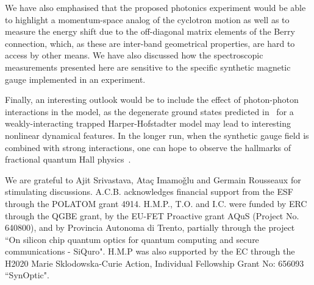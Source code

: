 \documentclass[twocolumn, 10pt, aps, superscriptaddress, floatfix, showpacs, pra, citeautoscript]{revtex4-1}
\begin{document}
We have also emphasised that the proposed photonics experiment would be able to highlight a momentum-space analog of the cyclotron motion as well as to measure the energy shift due to the off-diagonal matrix elements of the Berry connection, which, as these are inter-band geometrical properties, are hard to access by other means. We have also discussed how the spectroscopic measurements presented here are sensitive to the specific synthetic magnetic gauge implemented in an experiment. 

Finally, an interesting outlook would be to include the effect of photon-photon interactions in the model, as the degenerate ground states predicted in~\cite{ozawa2014momhh} for a weakly-interacting trapped Harper-Hofstadter model may lead to interesting nonlinear dynamical features. In the longer run, when the synthetic gauge field is combined with strong interactions, one can hope to observe the hallmarks of fractional quantum Hall physics~\cite{umucalilar2012fractional,hafezi2013non}.


\acknowledgments

We are grateful to Ajit Srivastava, Ata\c{c} Imamo\v{g}lu and Germain Rousseaux for stimulating discussions. A.C.B. acknowledges financial support from the ESF through the POLATOM grant 4914. H.M.P., T.O. and I.C. were funded by ERC through the QGBE grant, by the EU-FET Proactive grant AQuS (Project No. 640800), and by Provincia Autonoma di Trento, partially through the project ``On silicon chip quantum optics for quantum computing and secure communications - SiQuro". H.M.P was also supported by the EC through the H2020 Marie Sklodowska-Curie Action, Individual Fellowship Grant No: 656093 ``SynOptic".



\end{document}
